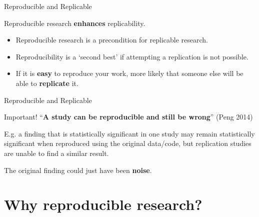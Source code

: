 \documentclass[10pt]{beamer}
\begin{document}
\begin{frame}{Reproducible and Replicable}

    Reproducible research \textbf{enhances} replicability.

    \begin{itemize}
        \item Reproducible research is a precondition for replicable research.

        \vspace{0.5cm}

        \item Reproducibility is a `second best' if attempting a replication is not possible.

        \vspace{0.5cm}

        \item If it is \textbf{easy} to reproduce your work, more likely that someone else will be able to \textbf{replicate} it.
    \end{itemize}

\end{frame}

\begin{frame}{Reproducible and Replicable}

    \begin{alertblock}{Important!}
        ``\textbf{A study can be reproducible and still be wrong}'' (Peng 2014)

        \vspace{0.5cm}

        E.g. a finding that is statistically significant in one study may remain statistically significant when reproduced using the original data/code, but replication studies are unable to find a similar result.

        \vspace{0.5cm}

        The original finding could just have been \textbf{noise}.
    \end{alertblock}

\end{frame}

\section{Why reproducible research?}
\end{document}
